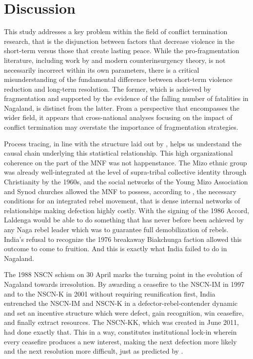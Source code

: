 \documentclass[12pt,a4paper]{article}
\begin{document}
\section{Discussion}

This study addresses a key problem within the field of conflict termination research, that is the disjunction between factors that decrease violence in the short-term versus those that create lasting peace. While the pro-fragmentation literature, including work by \citet{galula1964} and modern counterinsurgency theory, is not necessarily incorrect within its own parameters, there is a critical misunderstanding of the fundamental difference between short-term violence reduction and long-term resolution. The former, which is achieved by fragmentation and supported by the evidence of the falling number of fatalities in Nagaland, is distinct from the latter. From a perspective that encompasses the wider field, it appears that cross-national analyses focusing on the impact of conflict termination may overstate the importance of fragmentation strategies.

Process tracing, in line with the structure laid out by \citet{bennett_checkel2015}, helps us understand the causal chain underlying this statistical relationship. This high organizational coherence on the part of the MNF was not happenstance. The Mizo ethnic group was already well-integrated at the level of supra-tribal collective identity through Christianity by the 1960s, and the social networks of the Young Mizo Association and Synod churches allowed the MNF to possess, according to \citet{staniland2014}, the necessary conditions for an integrated rebel movement, that is dense internal networks of relationships making defection highly costly. With the signing of the 1986 Accord, Laldenga would be able to do something that has never before been achieved by any Naga rebel leader which was to guarantee full demobilization of rebels. India’s refusal to recognize the 1976 breakaway Biakchunga faction allowed this outcome to come to fruition. And this is exactly what India failed to do in Nagaland.

The 1988 NSCN schism on 30 April marks the turning point in the evolution of Nagaland towards irresolution. By awarding a ceasefire to the NSCN-IM in 1997 and to the NSCN-K in 2001 without requiring reunification first, India entrenched the NSCN-IM and NSCN-K in a defector-rebel-contender dynamic and set an incentive structure which were defect, gain recognition, win ceasefire, and finally extract resources. The NSCN-KK, which was created in June 2011, had done exactly that. This in a way, constitutes institutional lock-in wherein every ceasefire produces a new interest, making the next defection more likely and the next resolution more difficult, just as predicted by \citet{fjelde2018}.
\end{document}
